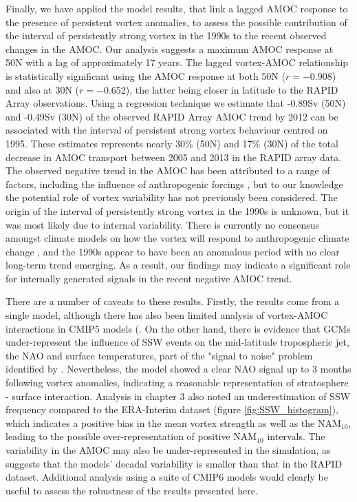 Finally, we have applied the model results, that link a lagged AMOC response to the presence of persistent vortex anomalies, to assess the possible contribution  of the interval of persistently strong vortex in the 1990s to the recent observed changes in the AMOC. Our analysis suggests a maximum AMOC response at 50N with a lag of approximately 17 years. The lagged vortex-AMOC relationship is statistically significant using the AMOC response at both 50N ($r = -0.908$) and also at 30N ($r = -0.652$), the latter being closer in latitude to the RAPID Array observations. Using a regression technique we estimate that -0.89Sv (50N) and -0.49Sv (30N) of the observed RAPID Array AMOC trend by 2012 can be associated with the interval of persistent strong vortex behaviour centred on 1995. These estimates represents nearly 30\% (50N) and 17\% (30N) of the total decrease in AMOC transport between 2005 and 2013 in the RAPID array data. The observed negative trend in the AMOC has been attributed to a range of factors, including the influence of anthropogenic forcings \citep{caesarObserved2018, caesarCurrent2021}, but to our knowledge the potential role of vortex variability has not previously been considered. The origin of the interval of persistently strong vortex in the 1990s is unknown, but it was most likely due to internal variability. There is currently no consensus amongst climate models on how the vortex will respond to anthropogenic climate change \citep{ayarzaguenaUncertainty2020b}, and the 1990s appear to have been an anomalous period with no clear long-term trend emerging. As a result, our findings may indicate a significant role for internally generated signals in the recent negative AMOC trend. 

There are a number of caveats to these results.  Firstly, the results come from a single model, although there has also been limited analysis of vortex-AMOC interactions in CMIP5 models (\cite{reichlerStratospheric2012}. On the other hand, there is evidence that GCMs under-represent the influence of SSW events on the mid-latitude tropospheric jet, the NAO and surface temperatures, part of the "signal to noise" problem identified by \cite{scaifeSignaltonoise2018}. Nevertheless, the model showed a clear NAO signal up to 3 months following vortex anomalies, indicating a reasonable representation of stratosphere - surface interaction. Analysis in chapter 3 also noted an underestimation of SSW frequency compared to the ERA-Interim dataset (figure \ref{fig:SSW_histogram}), which indicates a positive bias in the mean vortex strength as well as the NAM$_{10}$, leading to the possible over-representation of positive NAM$_{10}$ intervals. The variability in the AMOC may also be under-represented in the simulation, as \cite{roberts20042014} suggests that the  models' decadal variability is smaller than that in the RAPID dataset. Additional analysis using a suite of CMIP6 models would clearly be useful to assess the robustness of the results presented here. 

